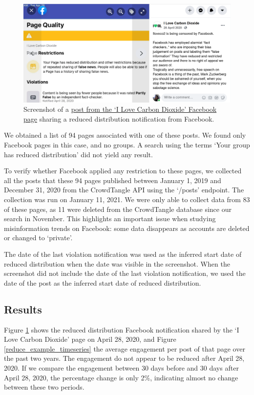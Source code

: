 \documentclass[11pt,a4paper]{article}
\begin{document}
\begin{figure}[!h]
\centering
\includegraphics[width=\linewidth]{./../figure/reduce_example_screenshot.png}
\caption{Screenshot of a \href{https://www.facebook.com/64162630683/posts/10156872415530684}{post from the `I Love Carbon Dioxide' Facebook page} sharing a reduced distribution notification from Facebook.}
\label{reduce_example_screenshot}
\end{figure}

We obtained a list of 94 pages associated with one of these posts. 
We found only Facebook pages in this case, and no groups. 
A search using the terms `Your group has reduced distribution' did not yield any result.

To verify whether Facebook applied any restriction to these pages, we collected all the posts that these 94 pages published between January 1, 2019 and December 31, 2020 from the CrowdTangle API using the `/posts' endpoint. 
The collection was run on January 11, 2021. 
We were only able to collect data from 83 of these pages, as 11 were deleted from the CrowdTangle database since our search in November. 
This highlights an important issue when studying misinformation trends on Facebook: some data disappears as accounts are deleted or changed to ‘private’.

The date of the last violation notification was used as the inferred start date of reduced distribution when the date was visible in the screenshot. 
When the screenshot did not include the date of the last violation notification, we used the date of the post as the inferred start date of reduced distribution. 

\subsection{Results}

Figure \ref{reduce_example_screenshot} shows the reduced distribution Facebook notification shared by the ‘I Love Carbon Dioxide’ page on April 28, 2020, and Figure \ref{reduce_example_timeseries} the average engagement per post of that page over the past two years. The engagement do not appear to be reduced after April 28, 2020. 
If we compare the engagement between 30 days before and 30 days after April 28, 2020, the percentage change is only 2\%, indicating almost no change between these two periods.
\end{document}
